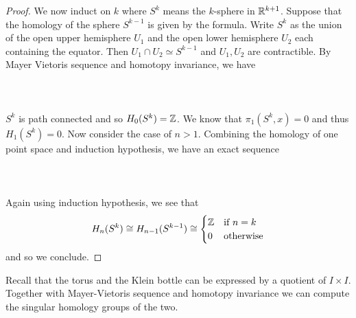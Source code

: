 \documentclass[a4paper]{article}
\begin{document}
\begin{eg}{}{}
\begin{proof}
We now induct on $k$ where $S^k$ means the $k$-sphere in $\mathbb{R}^{k+1}$. Suppose that the homology of the sphere $S^{k-1}$ is given by the formula. Write $S^k$ as the union of the open upper hemisphere $U_1$ and the open lower hemisphere $U_2$ each containing the equator. Then $U_1\cap U_2\simeq S^{k-1}$ and $U_1,U_2$ are contractible. By Mayer Vietoris sequence and homotopy invariance, we have \\~\\
\\~\\
$S^k$ is path connected and so $H_0(S^k)=\mathbb{Z}$. We know that $\pi_1(S^k,x)=0$ and thus $H_1(S^k)=0$. Now consider the case of $n>1$. Combining the homology of one point space and induction hypothesis, we have an exact sequence \\~\\
\\~\\
Again using induction hypothesis, we see that $$H_n(S^k)\cong H_{n-1}(S^{k-1})\cong\begin{cases}
\mathbb{Z} & \text{if } n=k\\
0 & \text{otherwise}
\end{cases}$$
and so we conclude. 
\end{proof}
\end{eg}

Recall that the torus and the Klein bottle can be expressed by a quotient of $I\times I$. Together with Mayer-Vietoris sequence and homotopy invariance we can compute the singular homology groups of the two. 
\end{document}
